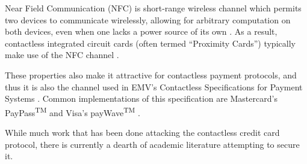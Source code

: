 Near Field Communication (NFC) is short-range wireless channel which permits two devices to communicate wirelessly,
  allowing for arbitrary computation on both devices,
  even when one lacks a power source of its own \cite{nfcspec}.
As a result, contactless integrated circuit cards (often termed ``Proximity Cards'') typically make use of the NFC channel \cite{nfciso}.

These properties also make it attractive for contactless payment protocols,
  and thus it is also the channel used in EMV's Contactless Specifications for Payment Systems \cite{emv}.
Common implementations of this specification are Mastercard's PayPass\textsuperscript{TM} \cite{paypass} and Visa's payWave\textsuperscript{TM} \cite{paywave}.

While much work that has been done attacking the contactless credit card protocol,
  there is currently a dearth of academic literature attempting to secure it.
